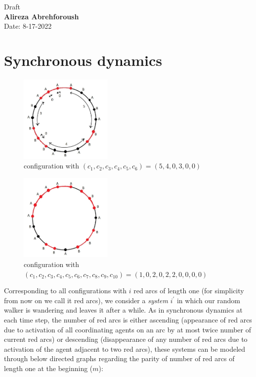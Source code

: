 \documentclass[]{book}
\theoremstyle{definition}
\begin{document}
\begin{center}
{\Large Draft}\\
\textbf{Alireza Abrehforoush}\\ %
Date: 8-17-2022 %
\end{center}
\vspace{0.2 cm}
\section{Synchronous dynamics}
\begin{figure}[H]
    \centering\includegraphics[width=0.4\textwidth]{figures/pic2.jpg}
    \caption{configuration with $\left(c_{1}, c_{2}, c_{3}, c_{4}, c_{5}, c_{6}\right) = \left(5, 4, 0, 3, 0, 0\right)$}
\end{figure}
\begin{figure}[H]
    \centering
    \includegraphics[width=0.4\textwidth]{figures/sync.jpg}
    \caption{configuration with $\left(c_{1}, c_{2}, c_{3}, c_{4}, c_{5}, c_{6}, c_{7}, c_{8}, c_{9}, c_{10}\right) = \left(1, 0, 2, 0, 2, 2, 0, 0, 0, 0\right)$}
\end{figure}

Corresponding to all configurations with $i$ red arcs of length one (for simplicity from now on we call it red arcs), we consider a \emph{system} $i^\prime$ in which our random walker is wandering and leaves it after a while. As in synchronous dynamics at each time step, the number of red arcs is either ascending (appearance of red arcs due to activation of all coordinating agents on an arc by at most twice number of current red arcs) or descending (disappearance of any number of red arcs due to activation of the agent adjacent to two red arcs), these systems can be modeled through below directed graphs regarding the parity of number of red arcs of length one at the beginning ($m$):
\end{document}
